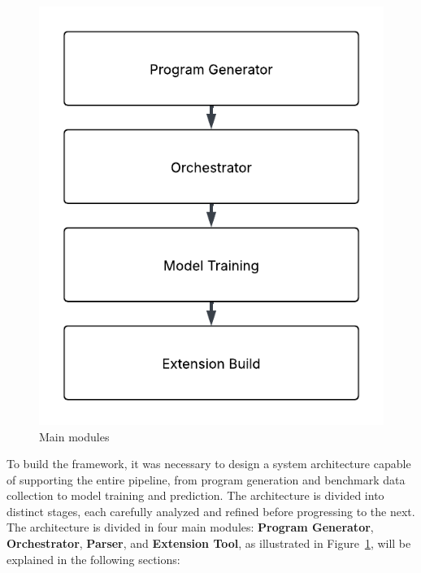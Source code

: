 \begin{figure}[htbp]
  \centering
  \includegraphics[scale=0.7]{figures/main_modules.pdf}
  \caption{Main modules}
  \label{fig:main_modules}
\end{figure}




{\color{blue}To build the framework, it was necessary to design a system architecture capable of supporting the entire pipeline, from program generation and benchmark data collection to model training and prediction. The architecture is divided into distinct stages, each carefully analyzed and refined before progressing to the next.}
The architecture is divided in four main modules: \textbf{Program Generator}, \textbf{Orchestrator}, \textbf{Parser}, and \textbf{Extension Tool}, as illustrated in Figure~\ref{fig:main_modules}, will be explained in the following sections:










